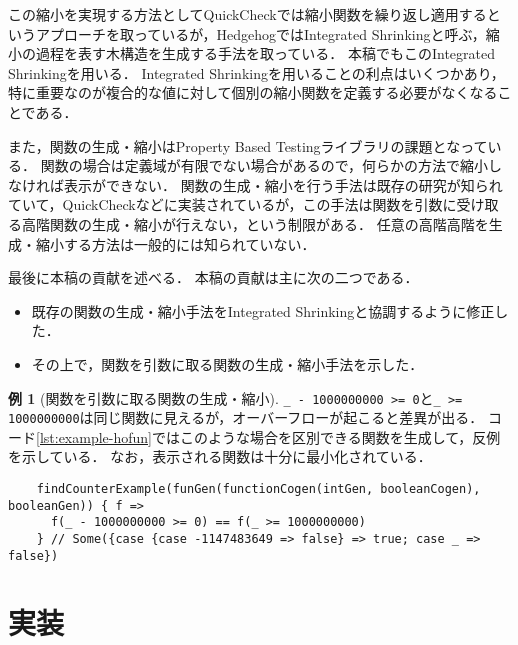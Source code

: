 \documentclass[submit,PRO]{ipsj}
\theoremstyle{definition}
\newtheorem{example}{例}
\begin{document}
この縮小を実現する方法としてQuickCheckでは縮小関数を繰り返し適用するというアプローチを取っているが，Hedgehog\cite{hedgehog_online}ではIntegrated Shrinkingと呼ぶ，縮小の過程を表す木構造を生成する手法を取っている．
本稿でもこのIntegrated Shrinkingを用いる．
Integrated Shrinkingを用いることの利点はいくつかあり，特に重要なのが複合的な値に対して個別の縮小関数を定義する必要がなくなることである．

また，関数の生成・縮小はProperty Based Testingライブラリの課題となっている．
関数の場合は定義域が有限でない場合があるので，何らかの方法で縮小しなければ表示ができない．
関数の生成・縮小を行う手法は既存の研究\cite{claessen_shrinking_2012,koopman_automatic_2006}が知られていて，QuickCheckなどに実装されているが，この手法は関数を引数に受け取る高階関数の生成・縮小が行えない，という制限がある．
任意の高階高階を生成・縮小する方法は一般的には知られていない．

最後に本稿の貢献を述べる．
本稿の貢献は主に次の二つである．

\begin{itemize}
  \item 既存の関数の生成・縮小手法をIntegrated Shrinkingと協調するように修正した．
  \item その上で，関数を引数に取る関数の生成・縮小手法を示した．
\end{itemize}

\begin{example}[関数を引数に取る関数の生成・縮小]\label{exm:shrink}
\texttt{\_ - 1000000000 >= 0}と\texttt{\_ >= 1000000000}は同じ関数に見えるが，オーバーフローが起こると差異が出る．
コード\ref{lst:example-hofun}ではこのような場合を区別できる関数を生成して，反例を示している．
なお，表示される関数は十分に最小化されている．

\begin{listing*}[htb]
  \begin{verbatim}
    findCounterExample(funGen(functionCogen(intGen, booleanCogen), booleanGen)) { f =>
      f(_ - 1000000000 >= 0) == f(_ >= 1000000000)
    } // Some({case {case -1147483649 => false} => true; case _ => false})
  \end{verbatim}
  \caption{関数を引数に取る関数の生成・縮小の例}
  \label{lst:example-hofun}
  \end{listing*}
\end{example}

\section{実装}
\end{document}
